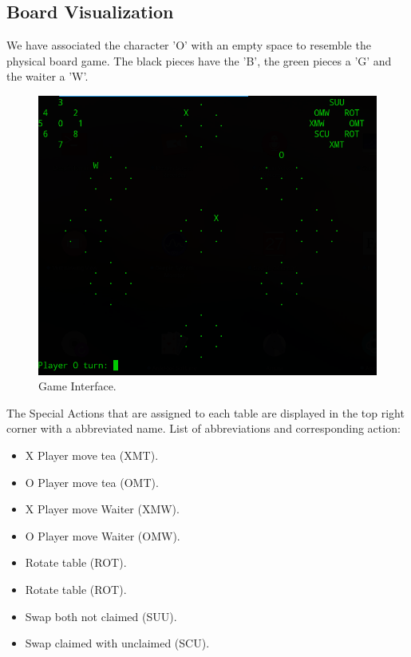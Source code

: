 \documentclass[a4paper]{article}
\begin{document}
\subsection{Board Visualization}

We have associated the character 'O' with an empty space to resemble the physical board
game. The black pieces have the 'B', the green pieces a 'G' and the waiter a 'W'.


\begin{figure}[H]
\centering

%
  \includegraphics[width=\linewidth]{game.png}
  \caption{Game Interface.}\label{fig:game}
\endminipage \vspace{10mm} \hfill

\end{figure}

The Special Actions that are assigned to each table are displayed in the top right corner with a abbreviated name.
List of abbreviations and corresponding action: \vspace{1mm}

 \begin{itemize}
    \item X Player move tea (XMT).
    \item O Player move tea (OMT).
    \item X Player move Waiter (XMW).
    \item O Player move Waiter (OMW).
    \item Rotate table (ROT).
    \item Rotate table (ROT).
    \item Swap both not claimed (SUU).
    \item Swap claimed with unclaimed (SCU).
\end{itemize}
\end{document}
